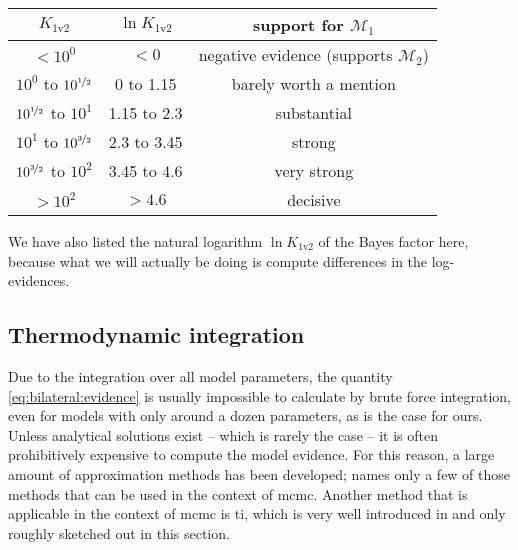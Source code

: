 \documentclass[\relativeRoot/main.tex]{subfiles}
\begin{document}
\begin{center}
    \begin{tabular}{ | c | c | c | }
        \hline
        $K_\text{1v2}$ & $\ln{K_\text{1v2}}$ & support for $\mathcal{M}_1$ \\
        \hline
        $< 10^0$ & $< 0$ & negative evidence (supports $\mathcal{M}_2$) \\
        $10^0$ to $10^{\nicefrac{1}{2}}$ & 0 to 1.15 & barely worth a mention \\
        $10^{\nicefrac{1}{2}}$ to $10^1$ & 1.15 to 2.3 & substantial \\
        $10^1$ to $10^{\nicefrac{3}{2}}$ & 2.3 to 3.45 & strong \\
        $10^{\nicefrac{3}{2}}$ to $10^2$ & 3.45 to 4.6 & very strong \\
        $> 10^2$ & $> 4.6$ & decisive \\
        \hline
    \end{tabular}
\end{center}

We have also listed the natural logarithm $\ln{K_\text{1v2}}$ of the Bayes factor here, because what we will actually be doing is compute differences in the log-evidences.

\subsection*{Thermodynamic integration}
\label{subsec:bilateral:model_comp:thermo_int}

Due to the integration over all model parameters, the quantity \cref{eq:bilateral:evidence} is usually impossible to calculate by brute force integration, even for models with only around a dozen parameters, as is the case for ours. Unless analytical solutions exist -- which is rarely the case -- it is often prohibitively expensive to compute the model evidence. For this reason, a large amount of approximation methods has been developed; \cite{friel_estimating_2011} names only a few of those methods that can be used in the context of \gls{mcmc}. Another method that is applicable in the context of \gls{mcmc} is \gls{ti}, which is very well introduced in \cite{aponte_introduction_2022} and only roughly sketched out in this section.
\end{document}

